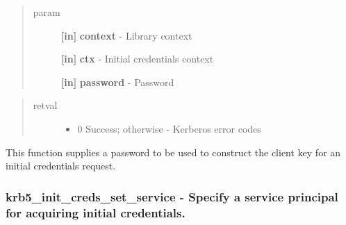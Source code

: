 \documentclass[letterpaper,10pt,english]{sphinxmanual}
\begin{document}
\begin{quote}\begin{description}
\item[{param}] \leavevmode
\textbf{{[}in{]}} \textbf{context} - Library context

\textbf{{[}in{]}} \textbf{ctx} - Initial credentials context

\textbf{{[}in{]}} \textbf{password} - Password

\end{description}\end{quote}
\begin{quote}\begin{description}
\item[{retval}] \leavevmode\begin{itemize}
\item {} 
0   Success; otherwise - Kerberos error codes

\end{itemize}

\end{description}\end{quote}

This function supplies a password to be used to construct the client key for an initial credentials request.


\subsubsection{krb5\_init\_creds\_set\_service -  Specify a service principal for acquiring initial credentials.}
\label{appdev/refs/api/krb5_init_creds_set_service::doc}\label{appdev/refs/api/krb5_init_creds_set_service:krb5-init-creds-set-service-specify-a-service-principal-for-acquiring-initial-credentials}

\begin{fulllineitems}
\label{appdev/refs/api/krb5_init_creds_set_service:krb5_init_creds_set_service}
\end{fulllineitems}
\end{document}

